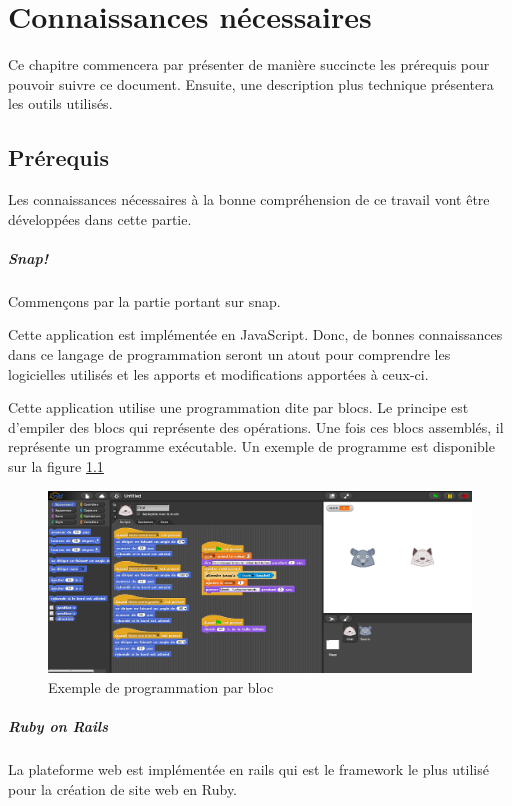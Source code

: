 \chapter{Connaissances nécessaires}
Ce chapitre commencera par présenter de manière succincte les prérequis pour pouvoir suivre ce document. Ensuite, une description plus technique présentera les outils utilisés.

\section{Prérequis}
Les connaissances nécessaires à la bonne compréhension de ce travail vont être développées dans cette partie.

\paragraph{Snap!}
Commençons par la partie portant sur \gls{snap}.

Cette application est implémentée en JavaScript. Donc, de bonnes connaissances dans ce langage de programmation seront un atout pour comprendre les logicielles utilisés et les apports et modifications apportées à ceux-ci.

Cette application utilise une programmation dite par \glspl{bloc}. Le principe est d'empiler des \glspl{bloc} qui représente des opérations. Une fois ces \glspl{bloc} assemblés, il représente un programme exécutable. Un exemple de programme est disponible sur la figure \ref{fig:prog}

\begin{figure}
  \begin{center}
  \includegraphics[width=\textwidth]{content/4-prerequis/images/snap}
        \caption{Exemple de programmation par bloc}
    \label{fig:prog}
  \end{center}
\end{figure}


\paragraph{Ruby on Rails}
La plateforme web est implémentée en \gls{rails} qui est le framework le plus utilisé pour la création de site web en Ruby.

